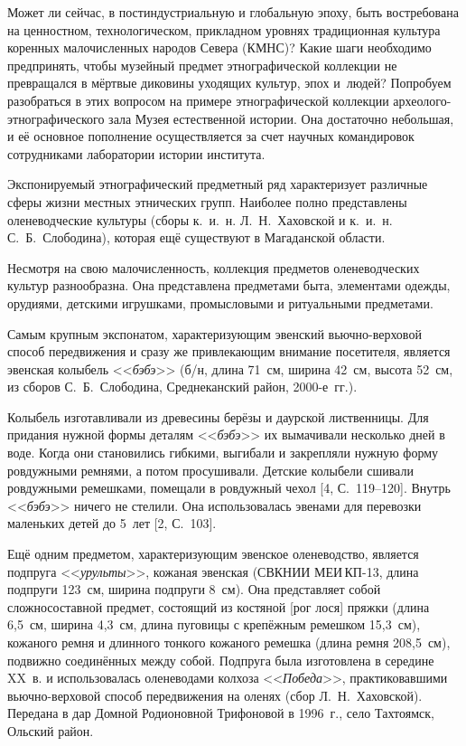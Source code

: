  

\makeProcTitle
{}

Может ли сейчас, в постиндустриальную и глобальную эпоху, быть востребована на ценностном, технологическом, прикладном уровнях традиционная культура коренных малочисленных народов Севера (КМНС)? Какие шаги необходимо предпринять, чтобы музейный предмет этнографической коллекции не превращался в мёртвые диковины уходящих культур, эпох и~людей? Попробуем разобраться в этих вопросом на примере этнографической коллекции археолого-этнографического зала Музея естественной истории. Она достаточно небольшая, и её основное пополнение осуществляется за счет научных командировок сотрудниками лаборатории истории института.

Экспонируемый этнографический предметный ряд характеризует различные сферы жизни местных этнических групп. Наиболее полно представлены оленеводческие культуры (сборы к.~и.~н. Л.~Н.~Хаховской и к.~и.~н. С.~Б.~Слободина), которая ещё существуют в Магаданской области.

Несмотря на свою малочисленность, коллекция предметов оленеводческих культур разнообразна. Она представлена предметами быта, элементами одежды, орудиями, детскими игрушками, промысловыми и ритуальными предметами.

Самым крупным экспонатом, характеризующим эвенский вьючно-вер\-хо\-вой способ передвижения и сразу же привлекающим внимание посетителя, является эвенская колыбель <<\textit{бэбэ}>> (б/н, длина 71~см, ширина 42~см, высота 52~см, из сборов С.~Б.~Слободина, Среднеканский район, 2000-е~гг.).

Колыбель изготавливали из древесины берёзы и даурской лиственницы. Для придания нужной формы деталям <<\textit{бэбэ}>> их вымачивали несколько дней в воде. Когда они становились гибкими, выгибали и закрепляли нужную форму ровдужными ремнями, а потом просушивали. Детские колыбели сшивали ровдужными ремешками, помещали в ровдужный чехол [4, С.~119--120]. Внутрь <<\textit{бэбэ}>> ничего не стелили. Она использовалась эвенами для перевозки маленьких детей до 5~лет [2, С.~103].

Ещё одним предметом, характеризующим эвенское оленеводство, является подпруга <<\textit{урульты}>>, кожаная эвенская (СВКНИИ МЕИ\,КП-13, длина подпруги 123~см, ширина подпруги 8~см). Она представляет собой сложносоставной предмет, состоящий из костяной [рог лося] пряжки (длина 6,5~см, ширина 4,3~см, длина пуговицы с крепёжным ремешком 15,3~см), кожаного ремня и длинного тонкого кожаного ремешка (длина ремня 208,5~см), подвижно соединённых между собой. Подпруга была изготовлена в середине XX~в. и использовалась оленеводами колхоза <<\textit{Победа}>>, практиковавшими вьючно-верховой способ передвижения на оленях (сбор Л.~Н.~Хаховской). Передана в дар Домной Родионовной Трифоновой в 1996~г., село Тахтоямск, Ольский район.

